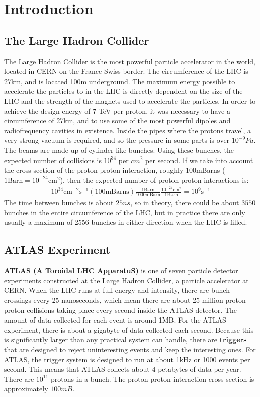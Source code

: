 \chapter{Introduction}
\section{The Large Hadron Collider}
The Large Hadron Collider is the most powerful particle accelerator in the world, located in CERN on the France-Swiss border.
The circumference of the LHC is 27km, and is located 100m underground. 
The maximum energy possible to accelerate the particles to in the LHC is directly dependent on the size of the LHC and the strength of the magnets used to accelerate the particles. 
In order to achieve the design energy of 7 TeV per proton, it was necessary to have a circumference of 27km, and to use some of the most powerful dipoles and radiofrequency cavities in existence. 
Inside the pipes where the protons travel, a very strong vacuum is required, and so the pressure in some parts is over $10^{-9}Pa$. 
The beams are made up of cylinder-like bunches. 
Using these bunches, the expected number of collisions is $10^{34}$ per $cm^2$ per second. If we take into account the cross section of the proton-proton interaction, roughly $100$mBarns ($1\textrm{Barn}=10^{-24}\textrm{cm}^{2}$), then the expected number of proton proton interactions is:
\begin{align}
10^{34}\textrm{cm}^{-2}\textrm{s}^{-1}(100\textrm{mBarns})\frac{1 \textrm{Barn}}{1000\textrm{mBarn}}\frac{10^{-24}\textrm{cm}^2}{1\textrm{Barn}}=10^{9}\textrm{s}^{-1}
		\label{proton-proton collisions per second}
\end{align}
The time between bunches is about $25ns$, so in theory, there could be about $3550$ bunches in the entire circumference of the LHC, but in practice there are only usually a maximum of 2556 bunches in either direction when the LHC is filled.
\section{ATLAS Experiment}
\textbf{ATLAS (A Toroidal LHC ApparatuS)} is one of seven particle detector experiments constructed at the Large Hadron Collider, a particle accelerator at CERN. 
When the LHC runs at full energy and intensity, there are bunch crossings every 25 nanoseconds, which mean there are about 25 million proton-proton collisions taking place every second inside the ATLAS detector. 
The amount of data collected for each event is around 1MB. For the ATLAS experiment, there is about a gigabyte of data collected each second. 
Because this is significantly larger than any practical system can handle, there are \textbf{triggers} that are designed to reject uninteresting events and keep the interesting ones. 
For ATLAS, the trigger system is designed to run at about 1kHz or 1000 events per second. 
This means that ATLAS collects about 4 petabytes of data per year. 
There are $10^{11}$ protons in a bunch. 
The proton-proton interaction cross section is approximately $100mB$.

